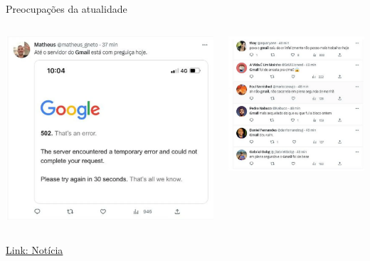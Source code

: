 \begin{frame}{Preocupações da atualidade}
    \centering
    \begin{columns}
        \begin{column}{0.48\linewidth}
            \includegraphics[width=\linewidth]{Figuras/gmail1.png}
        \end{column}
        \begin{column}{0.48\linewidth}
            \includegraphics[width=\linewidth]{Figuras/gmail2.png}
        \end{column}
    \end{columns}
    \href{https://g1.globo.com/tecnologia/noticia/2023/02/27/gmail-e-outros-servicos-do-google-apresentam-instabilidade-nesta-segunda.ghtml}{Link: Notícia}
\end{frame}



